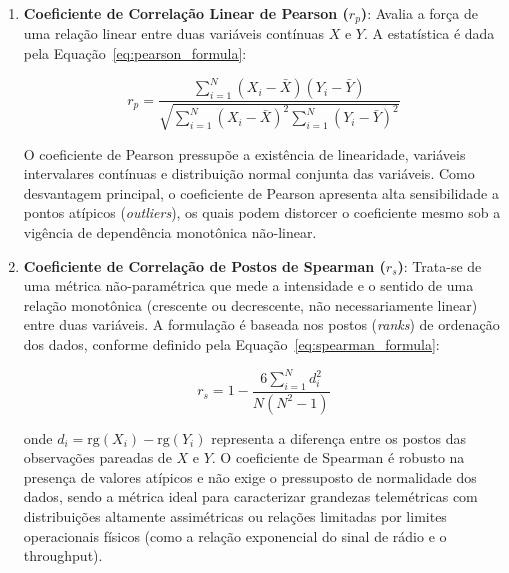 \begin{enumerate}
    \item \textbf{Coeficiente de Correlação Linear de Pearson ($r_p$)}: Avalia a força de uma relação linear entre duas variáveis contínuas $X$ e $Y$. A estatística é dada pela Equação~\ref{eq:pearson_formula}:
    
    \begin{equation}
    \label{eq:pearson_formula}
    r_p = \frac{\sum_{i=1}^{N} (X_i - \bar{X})(Y_i - \bar{Y})}{\sqrt{\sum_{i=1}^{N} (X_i - \bar{X})^2 \sum_{i=1}^{N} (Y_i - \bar{Y})^2}}
    \end{equation}
    
    O coeficiente de Pearson pressupõe a existência de linearidade, variáveis intervalares contínuas e distribuição normal conjunta das variáveis. Como desvantagem principal, o coeficiente de Pearson apresenta alta sensibilidade a pontos atípicos (\textit{outliers}), os quais podem distorcer o coeficiente mesmo sob a vigência de dependência monotônica não-linear.

    \item \textbf{Coeficiente de Correlação de Postos de Spearman ($r_s$)}: Trata-se de uma métrica não-paramétrica que mede a intensidade e o sentido de uma relação monotônica (crescente ou decrescente, não necessariamente linear) entre duas variáveis. A formulação é baseada nos postos (\textit{ranks}) de ordenação dos dados, conforme definido pela Equação~\ref{eq:spearman_formula}:
    
    \begin{equation}
    \label{eq:spearman_formula}
    r_s = 1 - \frac{6 \sum_{i=1}^{N} d_i^2}{N(N^2 - 1)}
    \end{equation}
    
    onde $d_i = \mathrm{rg}(X_i) - \mathrm{rg}(Y_i)$ representa a diferença entre os postos das observações pareadas de $X$ e $Y$. O coeficiente de Spearman é robusto na presença de valores atípicos e não exige o pressuposto de normalidade dos dados, sendo a métrica ideal para caracterizar grandezas telemétricas com distribuições altamente assimétricas ou relações limitadas por limites operacionais físicos (como a relação exponencial do sinal de rádio e o throughput).
\end{enumerate}

